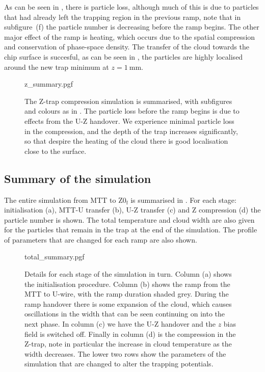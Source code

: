 As can be seen in , there is particle loss,
although much of this is due to particles that had already left the trapping
region in the previous ramp, note that in subfigure~(f) the particle number is
decreasing before the ramp begins. The other major effect of the ramp is
heating, which occurs due to the spatial compression and conservation of
phase-space density.
%
The transfer of the cloud towards the chip surface is succesful, as can be seen
in , the particles are highly localised around
the new trap minimum at $z=\SI{1}{\milli\meter}$.

\begin{figure}[p]
\centering
  {z_summary.pgf}
  \caption{
    The Z-trap compression simulation is summarised, with subfigures and colours as
    in . The particle loss before the ramp
    begins is due to effects from the U-Z handover. We experience minimal
    particle loss in the compression, and the depth of the trap increases
    significantly, so that despire the heating of the cloud there is good
    localisation close to the surface.
  }
  \label{design:fig:zsim}
\end{figure}

\subsection{Summary of the simulation}

The entire simulation from MTT to $\mathrm{Z0_f}$ is summarised in
. For each stage: initialisation (a), MTT-U
transfer (b), U-Z transfer (c) and Z compression (d) the particle number is
shown. The total temperature and cloud width are also given for the particles
that remain in the trap at the end of the simulation. The profile of parameters
that are changed for each ramp are also shown. 


\begin{figure}[p]
\centering
  {total_summary.pgf}
  \caption{
    Details for each stage of the simulation in turn. Column (a) shows the
    initialisation procedure. Column (b) shows the ramp from the MTT to U-wire,
    with the ramp duration shaded grey. During the ramp handover there is some
    expansion of the cloud, which causes oscillations in the width that can be
    seen continuing on into the next phase. In column (c) we have the U-Z
    handover and the $z$ bias field is switched off. Finally in column (d) is the
    compression in the Z-trap, note in particular the increase in cloud
    temperature as the width decreases. The lower two rows show the parameters
    of the simulation that are changed to alter the trapping potentials.
  }
  \label{design:fig:simsum}
\end{figure}

